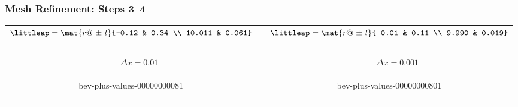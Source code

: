 \begin{frame}\frametitle{Mesh Refinement: Steps 3--4}
\footnotesize{
\begin{table}[htbp]
	\begin{center}
		\begin{tabular}{ccc}
			$\littleap=\mat{r@{\ \pm \ }l}{-0.12 & 0.34 \\ 10.011 & 0.061}$ &&
			$\littleap=\mat{r@{\ \pm \ }l}{ 0.01 & 0.11 \\  9.990 & 0.019}$ \\
				\ \\
			$\qquad \Delta x = 0.01$ && $\qquad \Delta x = 0.001$ \\
			\begin{overpic}[ scale = 0.8 ]
				{\pLocalGraphics bev-plus-values-00000000081}
				\xplacex	{$x, cm$}
				\xplacet	{\rotatebox{90}{$T, \degc$}}
			\end{overpic}  &&
			\begin{overpic}[ scale = 0.8 ]
				{\pLocalGraphics bev-plus-values-00000000801}
				\xplacex	{$x, cm$}
				\xplacet	{\rotatebox{90}{$T, \degc$}}
			\end{overpic}
		\end{tabular}
	\end{center}
\label{tab:bevington more data plots}
\end{table}}
\end{frame}
%
%
